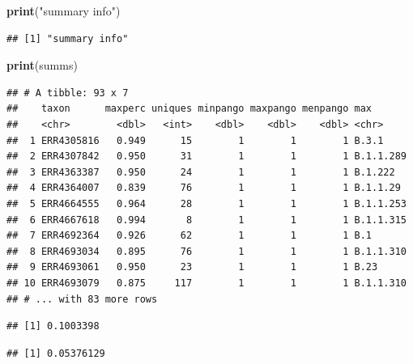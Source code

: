 \documentclass[
]{article}
\newenvironment{Shaded}{\begin{snugshade}}{\end{snugshade}}
\newcommand{\DecValTok}[1]{\textcolor[rgb]{0.00,0.00,0.81}{#1}}
\newcommand{\KeywordTok}[1]{\textcolor[rgb]{0.13,0.29,0.53}{\textbf{#1}}}
\newcommand{\NormalTok}[1]{#1}
\newcommand{\OperatorTok}[1]{\textcolor[rgb]{0.81,0.36,0.00}{\textbf{#1}}}
\newcommand{\StringTok}[1]{\textcolor[rgb]{0.31,0.60,0.02}{#1}}
\begin{document}
\begin{Shaded}
\begin{Highlighting}[]
\KeywordTok{print}\NormalTok{(}\StringTok{"summary info"}\NormalTok{)}
\end{Highlighting}
\end{Shaded}

\begin{verbatim}
## [1] "summary info"
\end{verbatim}

\begin{Shaded}
\begin{Highlighting}[]
\KeywordTok{print}\NormalTok{(summs)}
\end{Highlighting}
\end{Shaded}

\begin{verbatim}
## # A tibble: 93 x 7
##    taxon      maxperc uniques minpango maxpango menpango max      
##    <chr>        <dbl>   <int>    <dbl>    <dbl>    <dbl> <chr>    
##  1 ERR4305816   0.949      15        1        1        1 B.3.1    
##  2 ERR4307842   0.950      31        1        1        1 B.1.1.289
##  3 ERR4363387   0.950      24        1        1        1 B.1.222  
##  4 ERR4364007   0.839      76        1        1        1 B.1.1.29 
##  5 ERR4664555   0.964      28        1        1        1 B.1.1.253
##  6 ERR4667618   0.994       8        1        1        1 B.1.1.315
##  7 ERR4692364   0.926      62        1        1        1 B.1      
##  8 ERR4693034   0.895      76        1        1        1 B.1.1.310
##  9 ERR4693061   0.950      23        1        1        1 B.23     
## 10 ERR4693079   0.875     117        1        1        1 B.1.1.310
## # ... with 83 more rows
\end{verbatim}

\begin{Shaded}
\end{Shaded}

\begin{verbatim}
## [1] 0.1003398
\end{verbatim}

\begin{verbatim}
## [1] 0.05376129
\end{verbatim}
\end{document}
